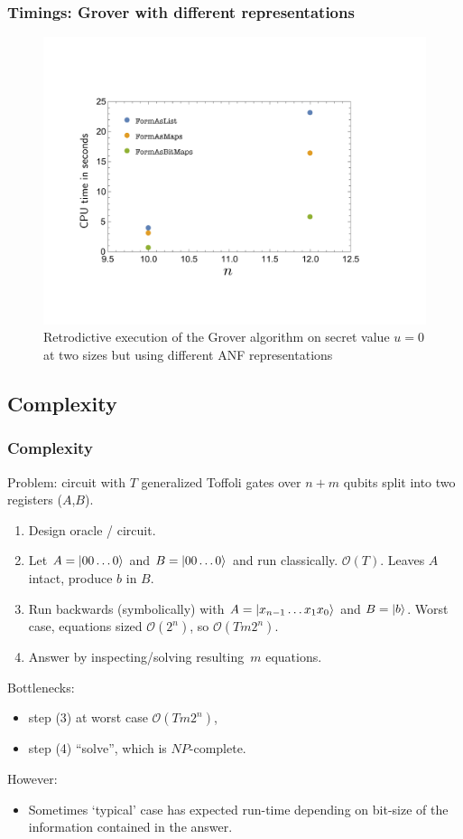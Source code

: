 \documentclass{beamer}
\begin{document}
\begin{frame}
  \frametitle{Timings: Grover with different representations}
\begin{figure}
\includegraphics[scale=0.30]{../../pepm/Figure14.pdf}
\caption{Retrodictive
  execution of the Grover algorithm on secret value $u=0$ at two
  sizes but using different ANF representations}
\end{figure}
\end{frame}

\subsection[Complexity]{Complexity}

\begin{frame}
  \frametitle{Complexity}
Problem: circuit with $T$ generalized Toffoli gates over $n+m$
  qubits split into two registers ($A$,$B$).

\begin{enumerate}
\item Design oracle / circuit.
\item Let $A = \ket{00\ldots 0}$ and $B = \ket{00\ldots 0}$ and run classically.
    $\mathcal{O}(T)$.
Leaves $A$ intact, produce $b$ in $B$.
\item Run backwards (symbolically) with
$A = \ket{ x_{n-1} \ldots x_1 x_0}$ and $B = \ket{b}$. Worst case,
    equations sized $\mathcal{O}(2^n)$, so $\mathcal{O}(Tm 2^n)$.
\item Answer by inspecting/solving resulting~$m$ equations. 
\end{enumerate}

\pause
  Bottlenecks:
  \begin{itemize}
    \item step (3) at worst case $\mathcal{O}(Tm 2^n)$, 
    \item step (4) ``solve'', which is $\mathit{NP}$-complete.
  \end{itemize}
  However:
  \begin{itemize}
    \item Sometimes `typical' case has expected run-time depending on bit-size of the
      information contained in the answer.
  \end{itemize}
\end{frame}
\end{document}
